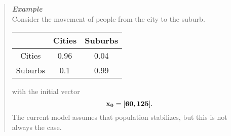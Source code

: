 \documentclass{hw}
\begin{document}
\begin{quote}
\textit{\textbf{Example}}\\
Consider the movement of people from the city to the suburb.
\begin{center}
\begin{tabular}{c | c c}
& Cities & Suburbs\\
\hline
Cities & 0.96 & 0.04\\
Suburbs & 0.1 & 0.99
\end{tabular}
\end{center}
with the initial vector
\[
\bf{x}_{0}=[60,125].
\]
The current model assumes that population stabilizes, but this is not always the case. 
\end{quote}
\end{document}
